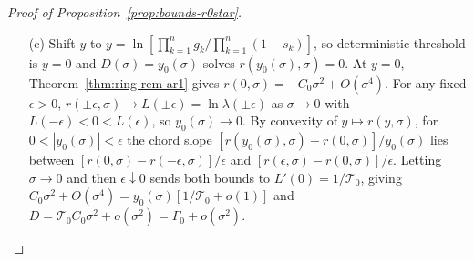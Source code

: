 \begin{proof}[Proof of Proposition~{\upshape\ref{prop:bounds-r0star}}]
\begin{enumerate}
To prove existence and uniqueness of $y_0$, when $n = 1$ and $s_1 = 0$, $r(y) = y - \sigma_1^2/2$ has the unique root $y_0 = \sigma_1^2/2$. Otherwise at least one $s_k > 0$. Set $g_k = c_k \ee^{y/n}$ with $\prod_{k=1}^n c_k = 1$. Every $t$-step path with $j$ transfers contributes a positive weight times $\ee^{jy/n}$; a sum of positive log-linear exponentials is log-convex and nondecreasing in $y$, so $t^{-1}\ln X(t)$ and its limit $r(y)$ are finite, convex, and nondecreasing on $\mathbb{R}$, hence continuous. A path that stays forever in a stage with $s_k > 0$ gives $r(y) \ge \max_k \ln s_k$, while the column-sum bound $r(y) \le \E\ln\max_k(s_k + c_k\ee^{y/n}h_k(0)) \to \max_k \ln s_k < 0$ as $y \to -\infty$ by dominated convergence. A path that transfers at every step gives $r(y) \ge y/n + n^{-1}\sum_{k=1}^n (\ln c_k - \ell_k) \to +\infty$ as $y \to +\infty$. By continuity $r(y)$ has a zero $y_0$. If $r(y_1) = r(y_2) = 0$ for $y_1 < y_2$, monotonicity and convexity would force $r(y) = 0$ on $[y_1, y_2]$ and $r(y) \ge 0$ for all $y < y_1$, contradicting $\lim_{y \to -\infty} r(y) = \max_k \ln s_k < 0$.
\item[(c)] Shift $y$ to $y = \ln[\prod_{k=1}^n g_k / \prod_{k=1}^n (1 - s_k)]$, so deterministic threshold is $y = 0$ and $D(\sigma) = y_0(\sigma)$ solves $r(y_0(\sigma), \sigma) = 0$. At $y = 0$, Theorem~\ref{thm:ring-rem-ar1} gives $r(0, \sigma) = -C_0\sigma^2 + O(\sigma^4)$. For any fixed $\epsilon > 0$, $r(\pm\epsilon, \sigma) \to L(\pm\epsilon) = \ln\lambda(\pm\epsilon)$ as $\sigma \to 0$ with $L(-\epsilon) < 0 < L(\epsilon)$, so $y_0(\sigma) \to 0$. By convexity of $y \mapsto r(y, \sigma)$, for $0 < |y_0(\sigma)| < \epsilon$ the chord slope $[r(y_0(\sigma), \sigma) - r(0, \sigma)]/y_0(\sigma)$ lies between $[r(0, \sigma) - r(-\epsilon, \sigma)]/\epsilon$ and $[r(\epsilon, \sigma) - r(0, \sigma)]/\epsilon$. Letting $\sigma \to 0$ and then $\epsilon \downarrow 0$ sends both bounds to $L'(0) = 1/\mathcal{T}_0$, giving $C_0\sigma^2 + O(\sigma^4) = y_0(\sigma)[1/\mathcal{T}_0 + o(1)]$ and $D = \mathcal{T}_0 C_0\sigma^2 + o(\sigma^2) = \Gamma_0 + o(\sigma^2)$.


\end{enumerate}
\end{proof}
